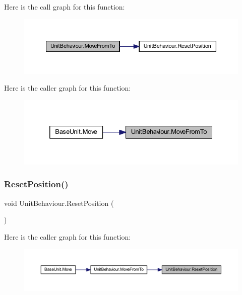 Here is the call graph for this function\+:
\nopagebreak
\begin{figure}[H]
\begin{center}
\leavevmode
\includegraphics[width=350pt]{class_unit_behaviour_a46ff5685dd97f930e6e2a835e01efb4d_cgraph}
\end{center}
\end{figure}
Here is the caller graph for this function\+:
\nopagebreak
\begin{figure}[H]
\begin{center}
\leavevmode
\includegraphics[width=332pt]{class_unit_behaviour_a46ff5685dd97f930e6e2a835e01efb4d_icgraph}
\end{center}
\end{figure}
\mbox{\label{class_unit_behaviour_a19e4ade6b8de90c269e3ed840d0c9f84}} 
\subsubsection{\texorpdfstring{ResetPosition()}{ResetPosition()}}
{\footnotesize\ttfamily void Unit\+Behaviour.\+Reset\+Position (\begin{DoxyParamCaption}{ }\end{DoxyParamCaption})}

Here is the caller graph for this function\+:
\nopagebreak
\begin{figure}[H]
\begin{center}
\leavevmode
\includegraphics[width=350pt]{class_unit_behaviour_a19e4ade6b8de90c269e3ed840d0c9f84_icgraph}
\end{center}
\end{figure}
\mbox{\label{class_unit_behaviour_a4b2664ef7a33e795220d587cb789d169}} 

